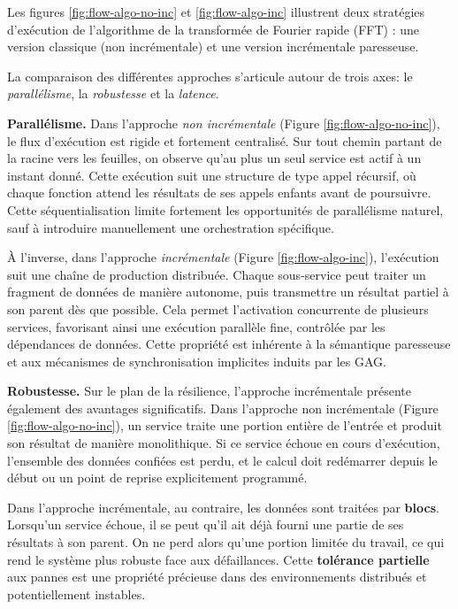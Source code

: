 Les figures \ref{fig:flow-algo-no-inc} et \ref{fig:flow-algo-inc} illustrent deux stratégies d’exécution de l’algorithme de la transformée de Fourier rapide (FFT) : une version classique (non incrémentale) et une version incrémentale paresseuse.

La comparaison des différentes approches s’articule autour de trois axes: le \textit{parallélisme}, la \textit{robustesse} et la \textit{latence}.

\textbf{Parallélisme.}
Dans l’approche \textit{non incrémentale} (Figure \ref{fig:flow-algo-no-inc}), le flux d’exécution est rigide et fortement centralisé. Sur tout chemin partant de la racine vers les feuilles, on observe qu’au plus un seul service est actif à un instant donné. Cette exécution suit une structure de type appel récursif, où chaque fonction attend les résultats de ses appels enfants avant de poursuivre. Cette séquentialisation limite fortement les opportunités de parallélisme naturel, sauf à introduire manuellement une orchestration spécifique.

À l’inverse, dans l’approche \textit{incrémentale} (Figure \ref{fig:flow-algo-inc}), l’exécution suit une chaîne de production distribuée. Chaque sous-service peut traiter un fragment de données de manière autonome, puis transmettre un résultat partiel à son parent dès que possible. Cela permet l’activation concurrente de plusieurs services, favorisant ainsi une exécution parallèle fine, contrôlée par les dépendances de données. Cette propriété est inhérente à la sémantique paresseuse et aux mécanismes de synchronisation implicites induits par les GAG.

\textbf{Robustesse.}
Sur le plan de la résilience, l’approche incrémentale présente également des avantages significatifs. Dans l’approche non incrémentale (Figure \ref{fig:flow-algo-no-inc}), un service traite une portion entière de l’entrée et produit son résultat de manière monolithique. Si ce service échoue en cours d’exécution, l’ensemble des données confiées est perdu, et le calcul doit redémarrer depuis le début ou un point de reprise explicitement programmé.

Dans l’approche incrémentale, au contraire, les données sont traitées par \textbf{blocs}. Lorsqu’un service échoue, il se peut qu’il ait déjà fourni une partie de ses résultats à son parent. On ne perd alors qu’une portion limitée du travail, ce qui rend le système plus robuste face aux défaillances. Cette \textbf{tolérance partielle} aux pannes est une propriété précieuse dans des environnements distribués et potentiellement instables.

